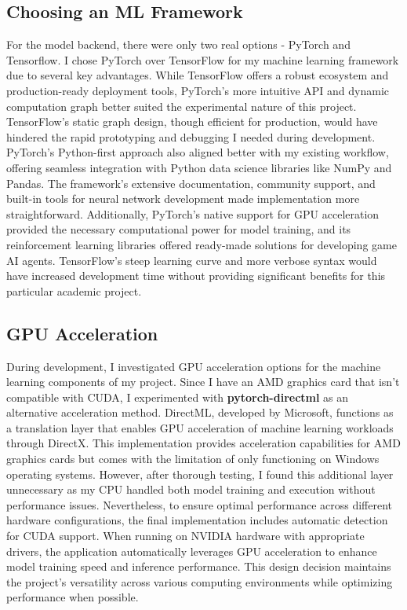 \subsection{Choosing an ML Framework}

For the model backend, there were only two real options - PyTorch and Tensorflow.
I chose PyTorch over TensorFlow for my machine learning framework due to several key advantages. 
While TensorFlow offers a robust ecosystem and production-ready deployment tools, PyTorch's more intuitive API and dynamic computation graph better suited the experimental nature of this project. 
TensorFlow's static graph design, though efficient for production, would have hindered the rapid prototyping and debugging I needed during development. 
PyTorch's Python-first approach also aligned better with my existing workflow, offering seamless integration with Python data science libraries like NumPy and Pandas. 
The framework's extensive documentation, community support, and built-in tools for neural network development made implementation more straightforward. 
Additionally, PyTorch's native support for GPU acceleration provided the necessary computational power for model training, and its reinforcement learning libraries offered ready-made solutions for developing game AI agents. 
TensorFlow's steep learning curve and more verbose syntax would have increased development time without providing significant benefits for this particular academic project.

\subsection{GPU Acceleration}

During development, I investigated GPU acceleration options for the machine learning components of my project. 
Since I have an AMD graphics card that isn't compatible with CUDA, I experimented with \textbf{pytorch-directml} as an alternative acceleration method. 
DirectML, developed by Microsoft, functions as a translation layer that enables GPU acceleration of machine learning workloads through DirectX. 
This implementation provides acceleration capabilities for AMD graphics cards but comes with the limitation of only functioning on Windows operating systems.
However, after thorough testing, I found this additional layer unnecessary as my CPU handled both model training and execution without performance issues.
Nevertheless, to ensure optimal performance across different hardware configurations, the final implementation includes automatic detection for CUDA support. 
When running on NVIDIA hardware with appropriate drivers, the application automatically leverages GPU acceleration to enhance model training speed and inference performance. 
This design decision maintains the project's versatility across various computing environments while optimizing performance when possible.

